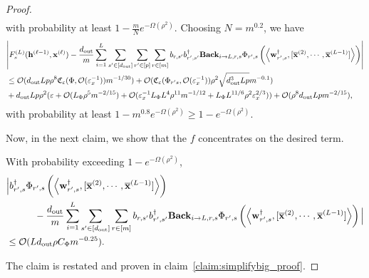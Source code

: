 \begin{proof}
\begin{align*}
			\end{align*}
			with probability at least $1 - \frac{m}{N}e^{-\Omega(\rho^2)}$.
			Choosing $N = m^{0.2}$, we have
			\begin{align}
				&\abs{ F_s^{(L)}(\mathbf{h}^{(\ell-1)}, \mathbf{x}^{(\ell)}) - \frac{d_{\mathrm{out}} }{m} \sum_{i=1}^{L}  \sum_{s' \in [d_{\mathrm{out}} ]} \sum_{r' \in [p]} \sum_{r \in [m]}  b_{r, s'} b_{r', s'}^{\dagger} \mathbf{Back}_{i \to L, r, s} \Phi_{r', s} \left(\left\langle \mathbf{w}_{r', s}^{\dagger}, [\overline{\mathbf{x}}^{(2)}, \cdots, \overline{\mathbf{x}}^{(L-1)}]\right\rangle\right) }\nonumber \\& \le \mathcal{O}(d_{\mathrm{out}} Lp\rho^8  \mathfrak{C}_{\varepsilon}(\Phi, \mathcal{O}(\varepsilon_x^{-1}))  m^{-1/30}) + \mathcal{O}(\mathfrak{C}_{\varepsilon}(\Phi_{r' s}, \mathcal{O}(\varepsilon_x^{-1})) \rho^2 \sqrt{d_{\mathrm{out}} ^3Lp} m^{-0.1})  \\& + d_{\mathrm{out}} Lp \rho^2 (\varepsilon + \mathcal{O}( L_{\Phi}\rho^5 m^{-2/15}) + \mathcal{O}(\varepsilon_x^{-1} L_{\Phi} L^4 \rho^{11} m^{-1/12} +  L_{\Phi} L^{11/6} 
				\rho^2\varepsilon_x^{2/3})) + \mathcal{O}(\rho^8d_{\mathrm{out}} Lp  m^{-2/15}) \label{eq:prefinalf},
			\end{align}
			with probability at least $1 -  m^{0.8} e^{-\Omega(\rho^2)} \ge 1 - e^{-\Omega(\rho^2)}$.  
			
			Now, in the next claim, we show that the $f$ concentrates on the desired term. 
			\begin{claim}\label{claim:simplifybig}
				With probability exceeding $1 - e^{-\Omega(\rho^2)}$,
				\begin{align*}
					&\Big|  b_{r', s}^{\dagger}  \Phi_{r', s} \left(\left\langle \mathbf{w}_{r', s}^{\dagger}, [\overline{\mathbf{x}}^{(2)}, \cdots, \overline{\mathbf{x}}^{(L-1)}]\right\rangle\right) \\& \quad \quad \quad - \frac{d_{\mathrm{out}} }{m} \sum_{i=1}^{L}  \sum_{s' \in [d_{\mathrm{out}} ]}  \sum_{r \in [m]}  b_{r, s'} b_{r', s'}^{\dagger} \mathbf{Back}_{i \to L, r, s} \Phi_{r', s} \left(\left\langle \mathbf{w}_{r', s}^{\dagger}, [\overline{\mathbf{x}}^{(2)}, \cdots, \overline{\mathbf{x}}^{(L-1)}]\right\rangle\right) \Big| \\&\le  \mathcal{O}(Ld_{\mathrm{out}}  \rho C_{\Phi} m^{-0.25}).
				\end{align*}
			\end{claim}
			The claim is restated and proven in claim~\ref{claim:simplifybig_proof}.	
				

\end{proof}
